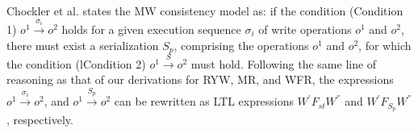 \documentclass[acmlarge, ,11pt]{acmart}
\begin{document}
  \par Chockler et al. states the MW consistency model as: if the condition (Condition 1)   $\mathit{o}^1 \xrightarrow{\sigma_i} \mathit{o}^2$ holds for a given execution sequence $\sigma_i$ of write operations $\mathit{o}^1$ and $\mathit{o}^2$, there must exist a serialization ${S_p}$, comprising the
   operations $\mathit{o}^1$ and $\mathit{o}^2$, for which the condition (lCondition 2)
  $\mathit{o}^1 \xrightarrow{S} \mathit{o}^2$ must hold.   Following the same line of reasoning as that of our derivations for RYW, MR, and WFR, the expressions $\mathit{o}^1 \xrightarrow{\sigma_i} \mathit{o}^2$,
  and $\mathit{o}^1 \xrightarrow{S_p} \mathit{o}^2$  can be rewritten as LTL expressions
   $W^{'} F_\mathit{st}  W^{''}$ and $W^{'} F_{S_p} W^{''}$, respectively.
\end{document}
